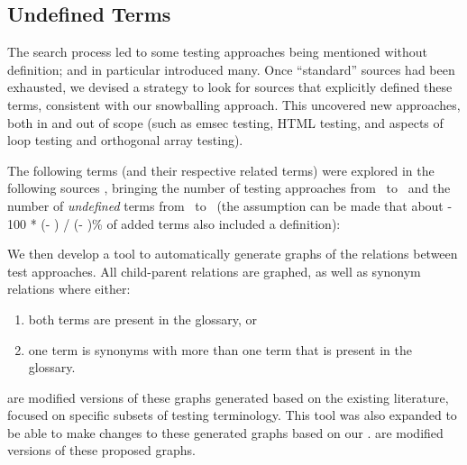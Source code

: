 \subsection{Undefined Terms}
\label{undef-terms}


\newcount\TotalBefore
\newcount\TotalAfter
\newcount\UndefBefore
\newcount\UndefAfter



The search process led to some testing approaches being
mentioned without definition;
\citep{IEEE2022} and \citep{Firesmith2015} in particular introduced many.
Once ``standard'' sources had been exhausted, we devised a strategy to
look for sources that explicitly defined these terms, consistent with
our snowballing approach. This uncovered new approaches, both in and out of
scope (such as \acf{emsec} testing, HTML testing, and aspects of loop testing and
orthogonal array testing).

The following terms (and their respective related terms)
were explored%
\ifnotpaper
      { in the following sources}%
\fi, bringing the number of testing
approaches from \the\TotalBefore~to \the\TotalAfter~and the number of
\emph{undefined} terms from \the\UndefBefore~to \the\UndefAfter~(the assumption
can be made that about \the{} - 100 * (\UndefAfter - \UndefBefore) /
(\TotalAfter - \TotalBefore)\relax\% of added terms also included a definition):



We then develop a tool to automatically generate graphs of the relations
between test approaches. All child-parent relations are graphed, as well as
synonym relations where either:
\begin{enumerate}
      \item both terms are present in the glossary, or
      \item one term is synonyms with more than one term that is present in the
            glossary.
\end{enumerate}
 are modified versions
of these graphs generated based on the existing literature, focused on specific
subsets of testing terminology. This tool was also expanded to be able to make
changes to these generated graphs based on our .
 are
modified versions of these proposed graphs.
